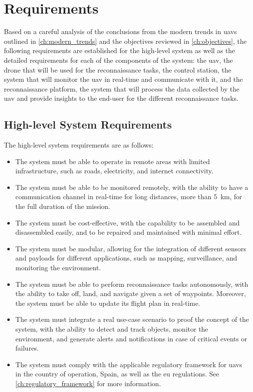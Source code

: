 \chapter{Requirements}\label{ch:requirements}

Based on a careful analysis of the conclusions from the modern trends in \glspl{uav} outlined in \cref{ch:modern_trends} and the objectives reviewed in \cref{ch:objectives}, the following requirements are established for the high-level system as well as the detailed requirements for each of the components of the system: the \gls{uav}, the drone that will be used for the reconnaissance tasks, the control station, the system that will monitor the \gls{uav} in real-time and communicate with it, and the reconnaissance platform, the system that will process the data collected by the \gls{uav} and provide insights to the end-user for the different reconnaissance tasks.

\section{High-level System Requirements}

The high-level system requirements are as follows:

\begin{itemize}
  \item The system must be able to operate in remote areas with limited infrastructure, such as roads, electricity, and internet connectivity.

  \item The system must be able to be monitored remotely, with the ability to have a communication channel in real-time for long distances, more than \SI{5}{\kilo\meter}, for the full duration of the mission.

  \item The system must be cost-effective, with the capability to be assembled and disassembled easily, and to be repaired and maintained with minimal effort.

  \item The system must be modular, allowing for the integration of different sensors and payloads for different applications, such as mapping, surveillance, and monitoring the environment.

  \item The system must be able to perform reconnaissance tasks autonomously, with the ability to take off, land, and navigate given a set of waypoints. Moreover, the system must be able to update its flight plan in real-time.

  \item The system must integrate a real use-case scenario to proof the concept of the system, with the ability to detect and track objects, monitor the environment, and generate alerts and notifications in case of critical events or failures.

  \item The system must comply with the applicable regulatory framework for \glspl{uav} in the country of operation, Spain, as well as the \gls{eu} regulations. See \cref{ch:regulatory_framework} for more information.
\end{itemize}

